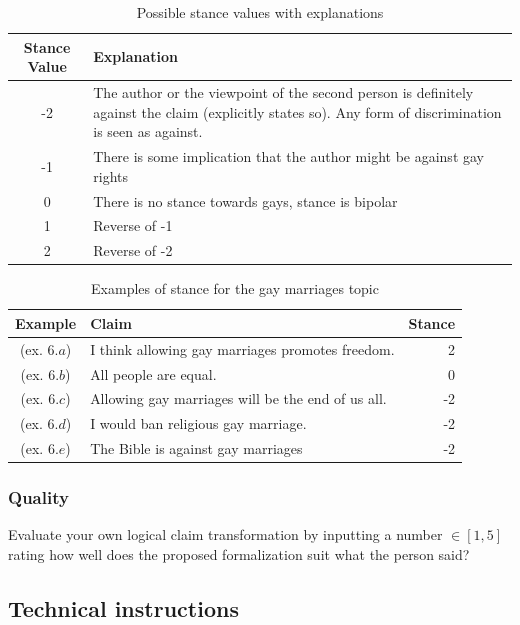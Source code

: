 \begin{table}[!htb]
\begin{tabular}{c p{10cm}}
\toprule
Stance Value & Explanation \\
\midrule
-2 & The author or the viewpoint of the second person is definitely against the
claim (explicitly states so). Any form of discrimination is seen as against.  \\
-1 & There is some implication that the author might be against gay rights  \\
0 & There is no stance towards gays, stance is bipolar \\
1 & Reverse of -1 \\
2 & Reverse of -2 \\
\bottomrule
\end{tabular}
\label{tab:stance}
\caption{Possible stance values with explanations}
\end{table}

\begin{table}[!htb]
\begin{tabular}{c p{10cm} r}
\toprule
Example & Claim & Stance \\
\midrule
(ex. $6.a$) &  I think allowing gay marriages promotes freedom. & 2 \\
(ex. $6.b$) & All people are equal. & 0 \\
(ex. $6.c$) & Allowing gay marriages will be the end of us all. &  -2 \\
(ex. $6.d$) & I would ban religious gay marriage. & -2 \\
(ex. $6.e$) & The Bible is against gay marriages & -2 \\
\bottomrule
\end{tabular}
\label{tab:stance_example}
\caption{Examples of stance for the gay marriages topic}
\end{table}

\subsubsection{Quality}

Evaluate your own logical claim transformation by inputting a number $\in [1, 5]$
rating how well does the proposed formalization suit what the person said?

\subsection{Technical instructions}

